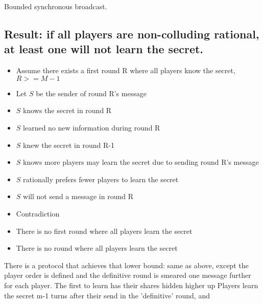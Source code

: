 \documentclass{article}
\begin{document}
Bounded synchronous broadcast.

\subsection{Result: if all players are non-colluding rational, at least one will not learn the secret.}
\begin{itemize}
  \item Assume there exists a first round R where all players know the secret, $R >= M-1$
  \item Let $S$ be the sender of round R's message
  \item $S$ knows the secret in round R
  \item $S$ learned no new information during round R
  \item $S$ knew the secret in round R-1
  \item $S$ knows more players may learn the secret due to sending round R's message
  \item $S$ rationally prefers fewer players to learn the secret 
  \item $S$ will not send a message in round R
  \item Contradiction
  \item There is no first round where all players learn the secret
  \item There is no round where all players learn the secret
\end{itemize}

There is a protocol that achieves that lower bound: same as above, except the player order is defined and the definitive round is smeared one message further for each player. The first to learn has their shares hidden higher up Players learn the secret m-1 turns after their send in the 'definitive' round, and
\end{document}
